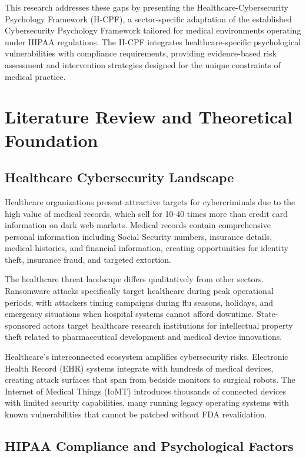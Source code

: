 \documentclass[10pt, twocolumn]{article}
\begin{document}
This research addresses these gaps by presenting the Healthcare-Cybersecurity Psychology Framework (H-CPF), a sector-specific adaptation of the established Cybersecurity Psychology Framework\cite{canale2024} tailored for medical environments operating under HIPAA regulations. The H-CPF integrates healthcare-specific psychological vulnerabilities with compliance requirements, providing evidence-based risk assessment and intervention strategies designed for the unique constraints of medical practice.

\section{Literature Review and Theoretical Foundation}

\subsection{Healthcare Cybersecurity Landscape}

Healthcare organizations present attractive targets for cybercriminals due to the high value of medical records, which sell for 10-40 times more than credit card information on dark web markets\cite{experian2019}. Medical records contain comprehensive personal information including Social Security numbers, insurance details, medical histories, and financial information, creating opportunities for identity theft, insurance fraud, and targeted extortion.

The healthcare threat landscape differs qualitatively from other sectors. Ransomware attacks specifically target healthcare during peak operational periods, with attackers timing campaigns during flu seasons, holidays, and emergency situations when hospital systems cannot afford downtime\cite{fbi2022}. State-sponsored actors target healthcare research institutions for intellectual property theft related to pharmaceutical development and medical device innovations\cite{cisa2022}.

Healthcare's interconnected ecosystem amplifies cybersecurity risks. Electronic Health Record (EHR) systems integrate with hundreds of medical devices, creating attack surfaces that span from bedside monitors to surgical robots. The Internet of Medical Things (IoMT) introduces thousands of connected devices with limited security capabilities, many running legacy operating systems with known vulnerabilities that cannot be patched without FDA revalidation\cite{fda2022}.

\subsection{HIPAA Compliance and Psychological Factors}
\end{document}
